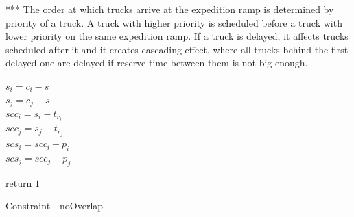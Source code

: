 \documentclass{ctuthesis}
\begin{document}
***
The order at which trucks arrive at the expedition ramp is determined by priority of a truck. A truck with higher priority is scheduled before a truck with lower priority on the same expedition ramp. If a truck is delayed, it affects trucks scheduled after it and it creates cascading effect, where all trucks behind the first delayed one are delayed if reserve time between them is not big enough. 


\label{overlap}
\begin{algorithm}[H]
\SetAlgoLined
{}

$s_i = c_i - s\;$\\
$s_j = c_j - s\;$\\
$scc_i = s_i - t_{r_i}\;$\\
$scc_j = s_j - t_{r_j}\;$\\

$scs_i = scc_i - p_i\;$\\
$scs_j = scc_j - p_j\;$



return $1\;$
 \caption{Constraint - noOverlap}
\end{algorithm}
\end{document}
